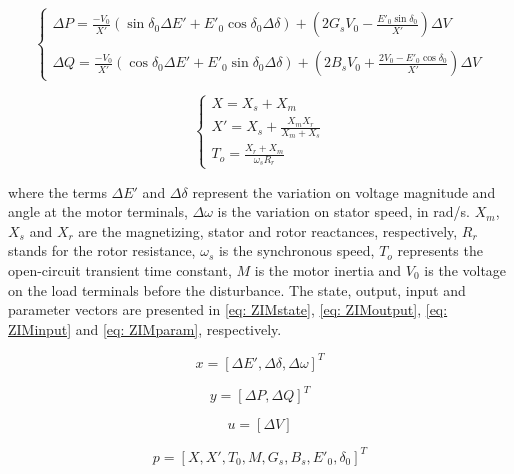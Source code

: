 \begin{equation}
    \begin{cases}
        \Delta P = \frac{-V_{0}}{X'}(\sin{\delta_{0}}\Delta E' + E'_{0}\cos{\delta_{0}}\Delta \delta) + \left(2G_{s} V_{0} - \frac{E'_{0} \sin{\delta_{0}}}{X'}\right)\Delta V \\
        \\
        \Delta Q = \frac{-V_{0}}{X'}(\cos{\delta_{0}}\Delta E' + E'_{0}\sin{\delta_{0}}\Delta\delta) + \left(2B_{s} V_{0} + \frac{2V_{0} - E'_{0} \cos{\delta_{0}}}{X'}\right)\Delta V
    \end{cases}
    \label{eq: yZIM}
\end{equation}

\begin{equation}
    \begin{cases}
    X = X_{s} + X_{m} \\
    X' = X_{s} + \frac{X_{m} X_{r}}{X_{m} + X_{s}} \\
    T_{o} = \frac{X_{r} + X_{m}}{\omega_{s} R_{r}}
    \end{cases}
    \label{eq: terms}
\end{equation}

\noindent where the terms $\Delta E'$ and $\Delta \delta$ represent the variation on voltage magnitude and angle at the motor terminals, $\Delta \omega$ is the variation on stator speed, in rad/s. $X_m$, $X_s$ and $X_r$ are the magnetizing, stator and rotor reactances, respectively, $R_r$ stands for the rotor resistance, $\omega_{s}$ is the synchronous speed, $T_o$ represents the open-circuit transient time constant, $M$ is the motor inertia and $V_{0}$ is the voltage on the load terminals before the disturbance. The state, output, input and parameter vectors are presented in \eqref{eq: ZIMstate}, \eqref{eq: ZIMoutput}, \eqref{eq: ZIMinput} and \eqref{eq: ZIMparam}, respectively.

\begin{equation}
	x = [\Delta E', \Delta \delta, \Delta \omega]^{T}
	\label{eq: ZIMstate}
\end{equation}

\begin{equation}
	y = [\Delta P, \Delta Q]^{T}
	\label{eq: ZIMoutput}
\end{equation}

\begin{equation}
	u = [\Delta V]
	\label{eq: ZIMinput}
\end{equation}

\begin{equation}
	p = [X, X', T_{0}, M, G_{s}, B_{s}, E'_{0}, \delta_{0}]^{T}
	\label{eq: ZIMparam}
\end{equation}

